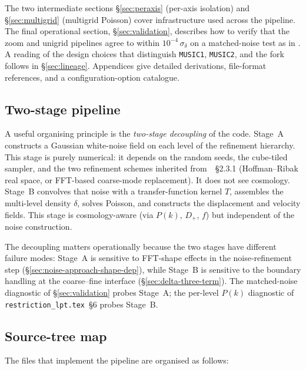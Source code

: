 \documentclass[12pt]{article}
\begin{document}
The two intermediate sections \S\ref{sec:peraxis} (per-axis isolation)
and \S\ref{sec:multigrid} (multigrid Poisson) cover infrastructure used
across the pipeline.  The final operational section,
\S\ref{sec:validation}, describes how to verify that the zoom and
unigrid pipelines agree to within $10^{-4}\,\sigma_\delta$ on a
matched-noise test as in \citet{Hahn2011}.  A reading of the design
choices that distinguish \texttt{MUSIC1}, \texttt{MUSIC2}, and the
fork follows in \S\ref{sec:lineage}.  Appendices give detailed
derivations, file-format references, and a configuration-option
catalogue.

\subsection{Two-stage pipeline}
\label{sec:two-stage}

A useful organising principle is the \emph{two-stage decoupling} of
the code.  Stage~A constructs a Gaussian white-noise field on each
level of the refinement hierarchy.  This stage is purely numerical:
it depends on the random seeds, the cube-tiled sampler, and the
two refinement schemes inherited from~\citet{Hahn2011}~\S2.3.1
(Hoffman--Ribak real space, or FFT-based coarse-mode replacement).
It does not see cosmology.  Stage~B convolves that noise with a
transfer-function kernel $T$, assembles the multi-level density
$\delta$, solves Poisson, and constructs the displacement and velocity
fields.  This stage is cosmology-aware (via $P(k)$, $D_+$, $f$) but
independent of the noise construction.

The decoupling matters operationally because the two stages have
different failure modes: Stage~A is sensitive to FFT-shape effects in
the noise-refinement step (\S\ref{sec:noise-approach-shape-dep}),
while Stage~B is sensitive to the boundary handling at the coarse--fine
interface (\S\ref{sec:delta-three-term}).  The matched-noise
diagnostic of \S\ref{sec:validation} probes Stage~A; the per-level
$P(k)$ diagnostic of \texttt{restriction\_lpt.tex}~\S6 probes
Stage~B.

\subsection{Source-tree map}
\label{sec:source-map}

The files that implement the pipeline are organised as follows:
\end{document}
